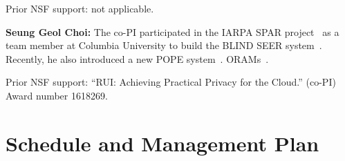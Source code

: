 \documentclass[11pt]{article}
\theoremstyle{remark}
\begin{document}
Prior NSF support: not applicable.

\textbf{Seung Geol Choi:}
The co-PI participated in the IARPA SPAR project~\cite{spar_baa} as a team
member at Columbia University to build the BLIND SEER
system~\cite{SP:PKVKMC14}. Recently, he also introduced a new POPE
system~\cite{CCS:RACY16}.  
%
ORAMs~\cite{SP:RocAviCho16,NDSS:ACMR17,CCS:RACM17}.

Prior NSF support: ``RUI: Achieving Practical Privacy for the Cloud.'' (co-PI) Award number 1618269.

\section{Schedule and Management Plan}



\end{document}

